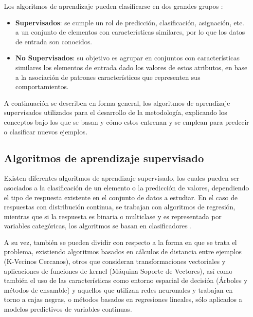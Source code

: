 Los algoritmos de aprendizaje pueden clasificarse en dos grandes grupos \cite{michie1994machine}:

\begin{itemize}
	
	\item \textbf{Supervisados}: se cumple un rol de predicción, clasificación, asignación, etc. a un conjunto de elementos con características similares, por lo que los datos de entrada son conocidos.
	
	\item \textbf{No Supervisados}: su objetivo es agrupar en conjuntos con características similares los elementos de entrada dado los valores de estos atributos, en base a la asociación de patrones característicos que representen sus comportamientos.
\end{itemize}

A continuación se describen en forma general, los algoritmos de aprendizaje supervisados utilizados para el desarrollo de la metodología, explicando los conceptos bajo los que se basan y cómo estos entrenan y se emplean para predecir o clasificar nuevos ejemplos.

\subsection{Algoritmos de aprendizaje supervisado}

Existen diferentes algoritmos de aprendizaje supervisado, los cuales pueden ser asociados a la clasificación de un elemento o la predicción de valores, dependiendo el tipo de respuesta existente en el conjunto de datos a estudiar. En el caso de respuestas con distribución continua, se trabajan con algoritmos de regresión, mientras que si la respuesta es binaria o multiclase y es representada por variables categóricas, los algoritmos se basan en clasificadores \cite{michie1994machine}.

A su vez, también se pueden dividir con respecto a la forma en que se trata el problema, existiendo algoritmos basados en cálculos de distancia entre ejemplos (K-Vecinos Cercanos), otros que consideran transformaciones vectoriales y aplicaciones de funciones de kernel (Máquina Soporte de Vectores), así como también el uso de las características como entorno espacial de decisión (Árboles y métodos de ensamble) y aquellos que utilizan redes neuronales y trabajan en torno a cajas negras, o métodos basados en regresiones lineales, sólo aplicados a modelos predictivos de variables continuas.

